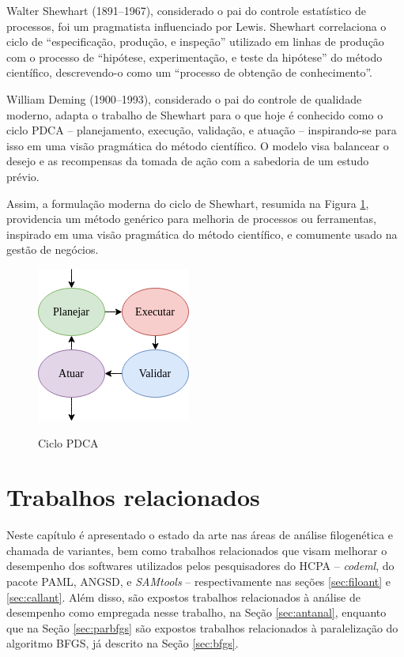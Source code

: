 \documentclass[cic,tc]{iiufrgs}
\begin{document}
Walter Shewhart (1891--1967), considerado o pai do controle estatístico de
processos, foi um pragmatista influenciado por Lewis. Shewhart correlaciona o
ciclo de ``especificação, produção, e inspeção'' utilizado em linhas de
produção com o processo de ``hipótese, experimentação, e teste da hipótese'' do
método científico, descrevendo-o como um ``processo de obtenção de
conhecimento''.

William Deming (1900--1993), considerado o pai do controle de qualidade
moderno, adapta o trabalho de Shewhart para o que hoje é conhecido como o ciclo
PDCA -- planejamento, execução, validação, e atuação -- inspirando-se para
isso em uma visão pragmática do método científico. O modelo visa balancear o
desejo e as recompensas da tomada de ação com a sabedoria de um estudo prévio.

Assim, a formulação moderna do ciclo de Shewhart, resumida na Figura
\ref{fig:pdca_orig}, providencia um método genérico para melhoria de processos
ou ferramentas, inspirado em uma visão pragmática do método científico, e
comumente usado na gestão de negócios.

\begin{figure} \caption{Ciclo PDCA} \begin{center}
\includegraphics[width=0.25\linewidth]{img/pdca_orig.png} \end{center}
 \label{fig:pdca_orig} \end{figure}


%
%
%
%

\chapter{Trabalhos relacionados}
\label{chap:anteriores}

Neste capítulo é apresentado o estado da arte nas áreas de análise filogenética
e chamada de variantes, bem como trabalhos relacionados que visam melhorar o
desempenho dos softwares utilizados pelos pesquisadores do HCPA --
\textit{codeml}, do pacote PAML, ANGSD, e \textit{SAMtools} -- respectivamente nas seções
\ref{sec:filoant} e \ref{sec:callant}. Além disso, são expostos trabalhos
relacionados à análise de desempenho como empregada nesse trabalho, na Seção
\ref{sec:antanal}, enquanto que na Seção \ref{sec:parbfgs} são expostos
trabalhos relacionados à paralelização do algoritmo BFGS, já descrito na Seção
\ref{sec:bfgs}.
\end{document}
